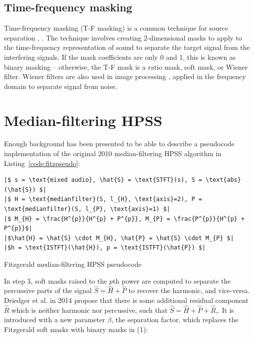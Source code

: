 \documentclass[letter,12pt]{article}
\begin{document}
\subsection{Time-frequency masking}

Time-frequency masking (T-F masking) is a common technique for source separation \cite{wang2008time}, \cite{timefreq2}. The technique involves creating 2-dimensional masks to apply to the time-frequency representation of sound to separate the target signal from the interfering signals. If the mask coefficients are only 0 and 1, this is known as binary masking -- otherwise, the T-F mask is a ratio mask, soft mask, or Wiener filter. Wiener filters are also used in image processing \cite{wienernoise}, applied in the frequency domain to separate signal from noise.

\section{Median-filtering HPSS}

Enough background has been presented to be able to describe a pseudocode implementation of the original 2010 median-filtering HPSS algorithm in Listing~\ref{code:fitzpseudo}:

\begin{listing}[h]
\setlength\partopsep{-\topsep}
\begin{verbatim}
|$ s = \text{mixed audio}, \hat{S} = \text{STFT}(s), S = \text{abs}(\hat{S}) $|
|$ H = \text{medianfilter}(S, l_{H}, \text{axis}=2), P = \text{medianfilter}(S, l_{P}, \text{axis}=1) $|
|$ M_{H} = \frac{H^{p}}{H^{p} + P^{p}}, M_{P} = \frac{P^{p}}{H^{p} + P^{p}}$|
|$\hat{H} = \hat{S} \cdot M_{H}, \hat{P} = \hat{S} \cdot M_{P} $|
|$h = \text{ISTFT}(\hat{H}), p = \text{ISTFT}(\hat{P}) $|
\end{verbatim}
\caption{Fitzgerald median-filtering HPSS pseudocode}
\label{code:fitzpseudo}
\end{listing}

 In step 3, soft masks raised to the $p$th power are computed to separate the percussive parts of the signal $\hat{S} = \hat{H} + \hat{P}$ to recover the harmonic, and vice-versa. Driedger et al. in 2014 \cite{driedger} propose that there is some additional residual component $\hat{R}$ which is neither harmonic nor percussive, such that $\hat{S} = \hat{H} + \hat{P} + \hat{R}$,. It is introduced with a new parameter $\beta$, the separation factor, which replaces the Fitzgerald soft masks with binary masks in (1):
\end{document}
